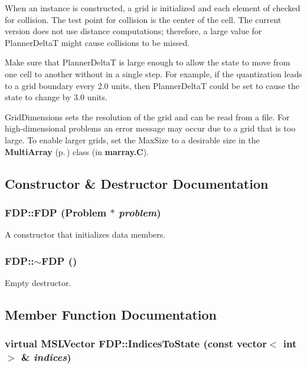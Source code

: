 When an instance is constructed, a grid is initialized and each element of checked for collision. The test point for collision is the center of the cell. The current version does not use distance computations; therefore, a large value for Planner\-Delta\-T might cause collisions to be missed.

Make sure that Planner\-Delta\-T is large enough to allow the state to move from one cell to another without in a single step. For example, if the quantization leads to a grid boundary every 2.0 units, then Planner\-Delta\-T could be set to cause the state to change by 3.0 units.

Grid\-Dimensions sets the resolution of the grid and can be read from a file. For high-dimensional problems an error message may occur due to a grid that is too large. To enable larger grids, set the Max\-Size to a desirable size in the {\bf Multi\-Array} {\rm (p.\,\pageref{class_MultiArray})} class (in {\bf marray.C}). 



\subsection{Constructor \& Destructor Documentation}
\subsubsection{\setlength{\rightskip}{0pt plus 5cm}FDP::FDP ({\bf Problem} $\ast$ {\em problem})}\label{class_FDP_a0}


A constructor that initializes data members.

\subsubsection{\setlength{\rightskip}{0pt plus 5cm}FDP::$\sim$FDP ()\hspace{0.3cm}{\tt  [inline]}}\label{class_FDP_a1}


Empty destructor.



\subsection{Member Function Documentation}
\subsubsection{\setlength{\rightskip}{0pt plus 5cm}virtual {\bf MSLVector} FDP::Indices\-To\-State (const vector$<$ int $>$ \& {\em indices})\hspace{0.3cm}{\tt  [protected, virtual]}}\label{class_FDP_b2}


